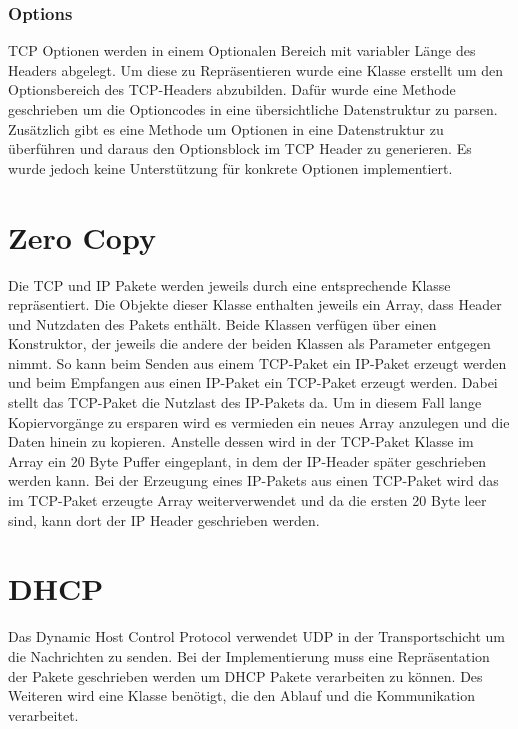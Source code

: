 \subsubsection{Options}
TCP Optionen werden in einem Optionalen Bereich mit variabler Länge des Headers abgelegt. Um diese zu Repräsentieren wurde eine Klasse erstellt um den Optionsbereich des TCP-Headers abzubilden. Dafür wurde eine Methode geschrieben um die Optioncodes in eine übersichtliche Datenstruktur zu parsen. Zusätzlich gibt es eine Methode um Optionen in eine Datenstruktur zu überführen und daraus den Optionsblock im TCP Header zu generieren. Es wurde jedoch keine Unterstützung für konkrete Optionen implementiert.



\section{Zero Copy}
Die TCP und IP Pakete werden jeweils durch eine entsprechende Klasse repräsentiert. Die Objekte dieser Klasse enthalten jeweils ein Array, dass Header und Nutzdaten des Pakets enthält. Beide Klassen verfügen über einen Konstruktor, der jeweils die andere der beiden Klassen als Parameter entgegen nimmt. So kann beim Senden aus einem TCP-Paket ein IP-Paket erzeugt werden und beim Empfangen aus einen IP-Paket ein TCP-Paket erzeugt werden. Dabei stellt das TCP-Paket die Nutzlast des IP-Pakets da. Um in diesem Fall lange Kopiervorgänge zu ersparen wird es vermieden ein neues Array anzulegen und die Daten hinein zu kopieren. Anstelle dessen wird in der TCP-Paket Klasse im Array ein 20 Byte Puffer eingeplant, in dem der IP-Header später geschrieben werden kann. Bei der Erzeugung eines IP-Pakets aus einen TCP-Paket wird das im TCP-Paket erzeugte Array weiterverwendet und da die ersten 20 Byte leer sind, kann dort der IP Header geschrieben werden.


\section{DHCP}
Das Dynamic Host Control Protocol verwendet UDP in der Transportschicht um die Nachrichten zu senden. Bei der Implementierung muss eine Repräsentation der Pakete geschrieben werden um DHCP Pakete verarbeiten zu können. Des Weiteren wird eine Klasse benötigt, die den Ablauf und die Kommunikation verarbeitet. 

